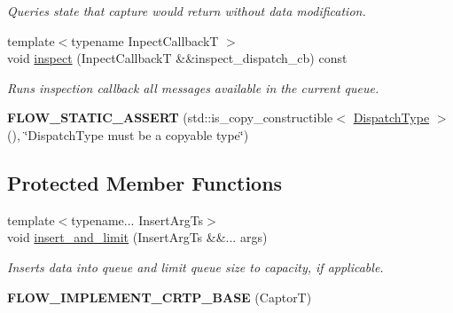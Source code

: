 \begin{DoxyCompactItemize}
\begin{DoxyCompactList}\small\item\em Queries state that {\ttfamily capture} would return without data modification. \end{DoxyCompactList}\item 
{\footnotesize template$<$typename Inpect\+CallbackT $>$ }\\void \hyperlink{classflow_1_1_captor_interface_a4648d1a3ec30a603e24e9ba0a667159d}{inspect} (Inpect\+CallbackT \&\&inspect\+\_\+dispatch\+\_\+cb) const
\begin{DoxyCompactList}\small\item\em Runs inspection callback all messages available in the current queue. \end{DoxyCompactList}\item 
\mbox{\label{classflow_1_1_captor_interface_a54c7551c6796e2b8d0ea500eab2c2af2}} 
{\bfseries F\+L\+O\+W\+\_\+\+S\+T\+A\+T\+I\+C\+\_\+\+A\+S\+S\+E\+RT} (std\+::is\+\_\+copy\+\_\+constructible$<$ \hyperlink{classflow_1_1_captor_interface_ae1eafeb6cd50f4a50843b963c232720a}{Dispatch\+Type} $>$(), \char`\"{}\textquotesingle{}Dispatch\+Type\textquotesingle{} must be a copyable type\char`\"{})
\end{DoxyCompactItemize}
\subsection*{Protected Member Functions}
\begin{DoxyCompactItemize}
\item 
{\footnotesize template$<$typename... Insert\+Arg\+Ts$>$ }\\void \hyperlink{classflow_1_1_captor_interface_ab1add272b1b90192edb6c567847140e7}{insert\+\_\+and\+\_\+limit} (Insert\+Arg\+Ts \&\&... args)
\begin{DoxyCompactList}\small\item\em Inserts data into queue and limit queue size to capacity, if applicable. \end{DoxyCompactList}\item 
\mbox{\label{classflow_1_1_captor_interface_ab7fafe6cdc7d20696c6751e507a252a9}} 
{\bfseries F\+L\+O\+W\+\_\+\+I\+M\+P\+L\+E\+M\+E\+N\+T\+\_\+\+C\+R\+T\+P\+\_\+\+B\+A\+SE} (CaptorT)
\end{DoxyCompactItemize}

